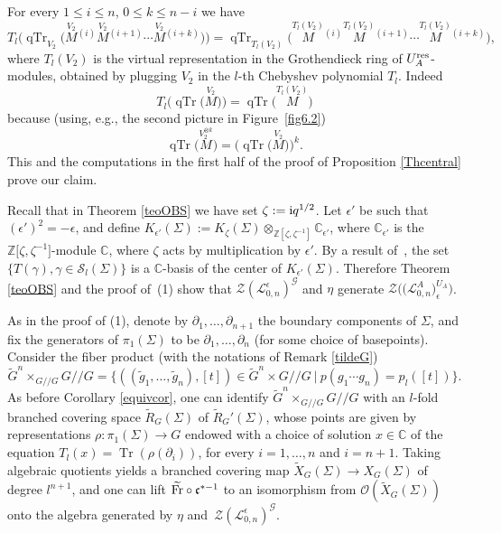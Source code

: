 \documentclass[pdftex]{sigma}%
\numberwithin{equation}{section}
\numberwithin{figure}{section}
\newcommand{\e}{\epsilon}
\newcommand{\mc}{\mathbb{C}}
\newcommand{\mz}{\mathbb{Z}}
\newcommand{\Gg}{{\mathcal G}}
\newcommand{\Ll}{{\mathcal L}}
\newcommand{\ra}{\rightarrow}
\begin{document}
\begin{remk}[{threading $T_l(V_2)$}] %
For every $1\leq i\leq n$, $0\leq k\leq n-i$ we have
\[
T_l \big(\!\operatorname{qTr}_{V_2} \big(\! \stackrel{V_2}{M}{}^{\!\! (i)}\stackrel{V_2}{M}{}^{\!\! (i+1)}\cdots \stackrel{V_2}{M}{}^{\!\! (i + k)}\big) \big) = \operatorname{qTr}_{T_l(V_2)} \big(\!\stackrel{T_l(V_2)}{M}{}^{\!\! (i)}\stackrel{T_l(V_2)}{M}{}^{\!\! (i+1)}\cdots \stackrel{T_l(V_2)}{M}{}^{\!\! (i + k)}\big),
\]
where $T_l(V_2)$ is the virtual representation in the Grothendieck ring of $U_A^{\rm res}$-modules, obtained by plugging $V_2$ in the $l$-th Chebyshev polynomial $T_l$. Indeed
\[
T_l\big(\!\operatorname{qTr}\big(\!\stackrel{V_2}{M}\big)\big)
= \operatorname{qTr}\big(\!\stackrel{\! T_l(V_2)}{M}\!\big)
\]
because (using, e.g., the second picture in Figure~\ref{fig6.2})
\[
\operatorname{qTr}\big(\!\!\stackrel{\! V_2^{\otimes k}}{M}\!\!\big) = \big(\!\operatorname{qTr}\big(\!\stackrel{V_2}{M}\big)\big)^k.
\]
This and the computations in the first half of the proof of Proposition \ref{Thcentral} prove our claim.
\end{remk}

\begin{remk}%
Recall that in Theorem \ref{teoOBS} we have set $\zeta:={\rm i}q^{1/2}$. Let $\epsilon'$ be such that $(\epsilon')^2 = -\epsilon$, and define $K_{\epsilon'}(\Sigma) := K_\zeta(\Sigma)\otimes_{\mz[\zeta,\zeta^{-1}]} \mc_{\epsilon'}$, where $\mc_{\epsilon'}$ is the $\mz\big[\zeta,\zeta^{-1}\big]$-module $\mc$, where $\zeta$ acts by multiplication by $\epsilon'$. By a result of~\cite{FKL}, the set $\{T(\gamma), \gamma\in\mathcal{S}_l(\Sigma)\}$ is a $\mc$-basis of the center of $K_{\e'}(\Sigma)$. Therefore Theorem \ref{teoOBS} and the proof of~(1) show that $\mathcal{Z}(\Ll_{0,n}^\e)^\Gg$ and $\eta$ generate $\mathcal{Z}\big(\big(\Ll_{0,n}^A\big)^{U_A}_\e\big)$.
\end{remk}


\begin{remk}\label{addX}
As in the proof of (1), denote by $\partial_1,\dots,\partial_{n+1}$ the boundary components of $\Sigma$, and fix the generators of $\pi_1(\Sigma)$ to be $\partial_1,\dots,\partial_n$ (for some choice of basepoints). Consider the fiber product (with the notations of Remark \ref{tildeG})
\[
\tilde{G}^n\times_{G/\!/G} G/\!/G= \big\lbrace ((\tilde{g}_1,\dots,\tilde{g}_n),[t])\in \tilde{G}^n\times G/\!/G\ |\ p(g_1\cdots g_n) = p_l([t])\big\rbrace .
\]
As before Corollary \ref{equivcor}, one can identify $\tilde{G}^n\times_{G/\!/G} G/\!/G$ with an $l$-fold branched covering space $\tilde R_G(\Sigma)$ of $\tilde R_G'(\Sigma)$, whose points are given by representations $\rho\colon \pi_1(\Sigma)\ra G$ endowed with a choice of solution $x\in \mc$ of the equation $T_l(x) = \operatorname{Tr}(\rho(\partial_i))$, for every $i=1,\dots,n$ and $i = n+1$. Taking algebraic quotients yields a branched covering map $\tilde X_G(\Sigma)\ra X_G(\Sigma)$ of degree $l^{n+1}$, and one can lift $\widetilde{\rm Fr}\circ \mathfrak{c}^{*-1}$ to an isomorphism from $\mathcal{O}(\tilde X_G(\Sigma))$ onto the algebra generated by $\eta$ and~$\mathcal{Z}(\Ll_{0,n}^\e)^\Gg$.
\end{remk}
\end{document}
